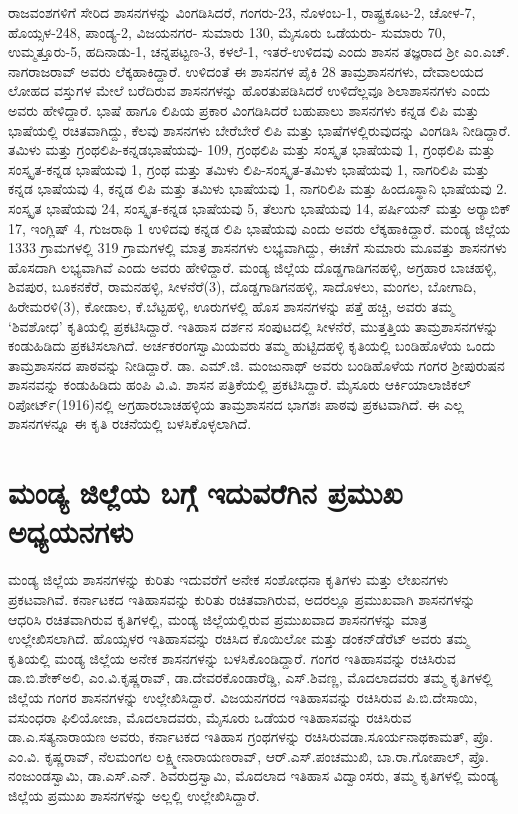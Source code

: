 ರಾಜವಂಶಗಳಿಗೆ ಸೇರಿದ ಶಾಸನಗಳನ್ನು ವಿಂಗಡಿಸಿದರೆ, ಗಂಗರು-23, ನೊಳಂಬ-1, ರಾಷ್ಟ್ರಕೂಟ-2, ಚೋಳ-7, ಹೊಯ್ಸಳ-248, ಪಾಂಡ್ಯ-2, ವಿಜಯನಗರ- ಸುಮಾರು 130, ಮೈಸೂರು ಒಡೆಯರು- ಸುಮಾರು 70, ಉಮ್ಮತ್ತೂರು-5, ಹದಿನಾಡು-1, ಚನ್ನಪಟ್ಟಣ-3, ಕಳಲೆ-1, ಇತರೆ-ಉಳಿದವು ಎಂದು ಶಾಸನ ತಜ್ಞರಾದ ಶ‍್ರೀ ಎಂ.ಎಚ್​. ನಾಗರಾಜರಾವ್​ ಅವರು ಲೆಕ್ಕಹಾಕಿದ್ದಾರೆ. ಉಳಿದಂತೆ ಈ ಶಾಸನಗಳ ಪೈಕಿ 28 ತಾಮ್ರಶಾಸನಗಳು, ದೇವಾಲಯದ ಲೋಹದ ವಸ್ತುಗಳ ಮೇಲೆ ಬರೆದಿರುವ ಶಾಸನಗಳನ್ನು ಹೊರತುಪಡಿಸಿದರೆ ಉಳಿದೆಲ್ಲವೂ ಶಿಲಾಶಾಸನಗಳು ಎಂದು ಅವರು ಹೇಳಿದ್ದಾರೆ. ಭಾಷೆ ಹಾಗೂ ಲಿಪಿಯ ಪ್ರಕಾರ ವಿಂಗಡಿಸಿದರೆ ಬಹುಪಾಲು ಶಾಸನಗಳು ಕನ್ನಡ ಲಿಪಿ ಮತ್ತು ಭಾಷೆಯಲ್ಲಿ ರಚಿತವಾಗಿದ್ದು, ಕೆಲವು ಶಾಸನಗಳು ಬೇರೆಬೇರೆ ಲಿಪಿ ಮತ್ತು ಭಾಷೆಗಳಲ್ಲಿರುವುದನ್ನು ವಿಂಗಡಿಸಿ ನೀಡಿದ್ದಾರೆ. ತಮಿಳು ಮತ್ತು ಗ್ರಂಥಲಿಪಿ-ಕನ್ನಡ\break ಭಾಷೆಯವು- 109, ಗ್ರಂಥಲಿಪಿ ಮತ್ತು ಸಂಸ್ಕೃತ ಭಾಷೆಯವು 1, ಗ್ರಂಥಲಿಪಿ ಮತ್ತು ಸಂಸ್ಕೃತ-ಕನ್ನಡ ಭಾಷೆಯವು 1, ಗ್ರಂಥ ಮತ್ತು ತಮಿಳು ಲಿಪಿ-ಸಂಸ್ಕೃತ-ತಮಿಳು ಭಾಷೆಯವು 1, ನಾಗರಿಲಿಪಿ ಮತ್ತು ಕನ್ನಡ ಭಾಷೆಯವು 4, ಕನ್ನಡ ಲಿಪಿ ಮತ್ತು ತಮಿಳು ಭಾಷೆಯವು 1, ನಾಗರಿಲಿಪಿ ಮತ್ತು ಹಿಂದೂಸ್ಥಾನಿ ಭಾಷೆಯವು 2. ಸಂಸ್ಕೃತ ಭಾಷೆಯವು 24, ಸಂಸ್ಕೃತ-ಕನ್ನಡ ಭಾಷೆಯವು 5, ತೆಲುಗು ಭಾಷೆಯವು 14, ಪರ್ಷಿಯನ್​ ಮತ್ತು ಅರ‌್ಯಾಬಿಕ್​ 17, ಇಂಗ್ಲಿಷ್​ 4, ಗುಜರಾಥಿ 1 ಉಳಿದವು ಕನ್ನಡ ಲಿಪಿ ಭಾಷೆಯವು ಎಂದು ಅವರು ಲೆಕ್ಕಹಾಕಿದ್ದಾರೆ. ಮಂಡ್ಯ ಜಿಲ್ಲೆಯ 1333 ಗ್ರಾಮಗಳಲ್ಲಿ 319 ಗ್ರಾಮಗಳಲ್ಲಿ ಮಾತ್ರ ಶಾಸನಗಳು ಲಭ್ಯವಾಗಿದ್ದು, ಈಚೆಗೆ ಸುಮಾರು ಮೂವತ್ತು ಶಾಸನಗಳು ಹೊಸದಾಗಿ ಲಭ್ಯವಾಗಿವೆ ಎಂದು ಅವರು ಹೇಳಿದ್ದಾರೆ. ಮಂಡ್ಯ ಜಿಲ್ಲೆಯ ದೊಡ್ಡಗಾಡಿಗನಹಳ್ಳಿ, ಅಗ್ರಹಾರ ಬಾಚಹಳ್ಳಿ, ಶಿವಪುರ, ಬೂಕನಕೆರೆ, ರಾಮನಹಳ್ಳಿ, ಸೀಳನೆರೆ(3), ದೊಡ್ಡಗಾಡಿಗನಹಳ್ಳಿ, ಸಾದೊಳಲು, ಮಂಗಲ, ಬೋಗಾದಿ, ಹಿರೇಮರಳಿ(3), ಕೋಡಾಲ, ಕೆ.ಬೆಟ್ಟಹಳ್ಳಿ, ಊರುಗಳಲ್ಲಿ ಹೊಸ ಶಾಸನಗಳನ್ನು ಪತ್ತೆ ಹಚ್ಚಿ, ಅವರು ತಮ್ಮ ‘ಶಿವಶೋಧ’ ಕೃತಿಯಲ್ಲಿ ಪ್ರಕಟಿಸಿದ್ದಾರೆ. ಇತಿಹಾಸ ದರ್ಶನ ಸಂಪುಟದಲ್ಲಿ ಸೀಳನೆರೆ, ಮುತ್ತತ್ತಿಯ ತಾಮ್ರಶಾಸನಗಳನ್ನು ಕಂಡುಹಿಡಿದು ಪ್ರಕಟಿಸಲಾಗಿದೆ. ಅರ್ಚಕರಂಗಸ್ವಾಮಿಯವರು ತಮ್ಮ ಹುಟ್ಟಿದಹಳ್ಳಿ ಕೃತಿಯಲ್ಲಿ ಬಂಡಿಹೊಳೆಯ ಒಂದು ತಾಮ್ರಶಾಸನದ ಪಾಠವನ್ನು ನೀಡಿದ್ದಾರೆ. ಡಾ. ಎಮ್.ಜಿ. ಮಂಜುನಾಥ್​ ಅವರು ಬಂಡಿಹೊಳೆಯ ಗಂಗರ ಶ‍್ರೀಪುರುಷನ ಶಾಸನವನ್ನು ಕಂಡುಹಿಡಿದು ಹಂಪಿ ವಿ.ವಿ. ಶಾಸನ ಪತ್ರಿಕೆಯಲ್ಲಿ ಪ್ರಕಟಿಸಿದ್ದಾರೆ. ಮೈಸೂರು ಆರ್ಕಿಯಾಲಾಜಿಕಲ್​ ರಿಪೋರ್ಟ್(1916)ನಲ್ಲಿ ಅಗ್ರಹಾರಬಾಚಹಳ್ಳಿಯ ತಾಮ್ರಶಾಸನದ ಭಾಗಶಃ ಪಾಠವು ಪ್ರಕಟವಾಗಿದೆ. ಈ ಎಲ್ಲ ಶಾಸನಗಳನ್ನೂ ಈ ಕೃತಿ ರಚನೆಯಲ್ಲಿ ಬಳಸಿಕೊಳ್ಳಲಾಗಿದೆ.

\section*{ಮಂಡ್ಯ ಜಿಲ್ಲೆಯ ಬಗ್ಗೆ ಇದುವರೆಗಿನ ಪ್ರಮುಖ ಅಧ್ಯಯನಗಳು}

ಮಂಡ್ಯ ಜಿಲ್ಲೆಯ ಶಾಸನಗಳನ್ನು ಕುರಿತು ಇದುವರೆಗೆ ಅನೇಕ ಸಂಶೋಧನಾ ಕೃತಿಗಳು ಮತ್ತು ಲೇಖನಗಳು ಪ್ರಕಟವಾಗಿವೆ. ಕರ್ನಾಟಕದ ಇತಿಹಾಸವನ್ನು ಕುರಿತು ರಚಿತವಾಗಿರುವ, ಅದರಲ್ಲೂ ಪ್ರಮುಖವಾಗಿ ಶಾಸನಗಳನ್ನು ಆಧರಿಸಿ ರಚಿತವಾಗಿರುವ ಕೃತಿಗಳಲ್ಲಿ, ಮಂಡ್ಯ ಜಿಲ್ಲೆಯಲ್ಲಿರುವ ಪ್ರಮುಖವಾದ ಶಾಸನಗಳನ್ನು ಮಾತ್ರ ಉಲ್ಲೇಖಿಸಲಾಗಿದೆ. ಹೊಯ್ಸಳರ ಇತಿಹಾಸವನ್ನು ರಚಿಸಿದ ಕೊಯಿಲೋ ಮತ್ತು ಡಂಕನ್​ಡೆರೆಟ್​ ಅವರು ತಮ್ಮ ಕೃತಿಯಲ್ಲಿ ಮಂಡ್ಯ ಜಿಲ್ಲೆಯ ಅನೇಕ ಶಾಸನಗಳನ್ನು ಬಳಸಿ\break ಕೊಂಡಿದ್ದಾರೆ. ಗಂಗರ ಇತಿಹಾಸವನ್ನು ರಚಿಸಿರುವ ಡಾ.ಬಿ.ಶೇಕ್​ಅಲಿ, ಎಂ.ವಿ.ಕೃಷ್ಣರಾವ್​, ಡಾ.ದೇವರಕೊಂಡಾರೆಡ್ಡಿ, ಎಸ್​.ಶಿವಣ್ಣ, ಮೊದಲಾದವರು ತಮ್ಮ ಕೃತಿಗಳಲ್ಲಿ ಜಿಲ್ಲೆಯ ಗಂಗರ ಶಾಸನಗಳನ್ನು ಉಲ್ಲೇಖಿಸಿದ್ದಾರೆ. ವಿಜಯನಗರದ ಇತಿಹಾಸವನ್ನು ರಚಿಸಿರುವ ಪಿ.ಬಿ.ದೇಸಾಯಿ, ವಸುಂಧರಾ ಫಿಲಿಯೋಜಾ, ಮೊದಲಾದವರು, ಮೈಸೂರು ಒಡೆಯರ ಇತಿಹಾಸವನ್ನು ರಚಿಸಿರುವ ಡಾ.ಎ.ಸತ್ಯನಾರಾಯಣ ಅವರು, ಕರ್ನಾಟಕದ ಇತಿಹಾಸ ಗ್ರಂಥಗಳನ್ನು ರಚಿಸಿರುವ\break ಡಾ.ಸೂರ್ಯನಾಥಕಾಮತ್​, ಪ್ರೊ. ಎಂ.ವಿ. ಕೃಷ್ಣರಾವ್​, ನೆಲಮಂಗಲ ಲಕ್ಷ್ಮೀನಾರಾಯಣರಾವ್​, ಆರ್​.ಎಸ್​.ಪಂಚಮುಖಿ, ಬಾ.ರಾ.ಗೋಪಾಲ್​, ಪ್ರೊ. ನಂಜುಂಡಸ್ವಾಮಿ, ಡಾ.ಎಸ್​.ಎನ್​. ಶಿವರುದ್ರಸ್ವಾಮಿ, ಮೊದಲಾದ ಇತಿಹಾಸ ವಿದ್ವಾಂಸರು, ತಮ್ಮ ಕೃತಿಗಳಲ್ಲಿ ಮಂಡ್ಯ ಜಿಲ್ಲೆಯ ಪ್ರಮುಖ ಶಾಸನಗಳನ್ನು ಅಲ್ಲಲ್ಲಿ ಉಲ್ಲೇಖಿಸಿದ್ದಾರೆ.

